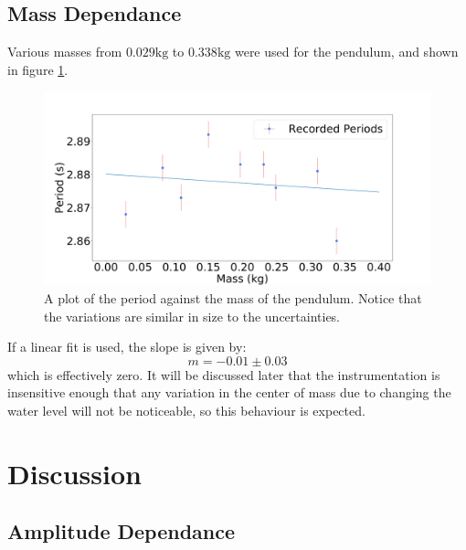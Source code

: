 \documentclass[%
 reprint,
 amsmath,amssymb
 aps,
]{revtex4-2}
\begin{document}
\subsection{Mass Dependance}
Various masses from $0.029\si{\kilogram}$ to $0.338\si{\kilogram}$ were used for the pendulum, and shown in figure \ref{fig:mass-simple}.
\begin{figure}[!h]
    \includegraphics[width=\linewidth]{Figures/mass_simple.png}

    \caption{A plot of the period against the mass of the pendulum. Notice that the variations are similar in size to the uncertainties.}
    \label{fig:mass-simple}
\end{figure}
If a linear fit is used, the slope is given by:
\begin{equation}
    m = -0.01 \pm 0.03
    \label{eq:}
\end{equation}
which is effectively zero. It will be discussed later that the instrumentation is insensitive enough that any variation in the center of mass due to changing the water level will not be noticeable, so this behaviour is expected.%
\section{Discussion}
\subsection{Amplitude Dependance}
\end{document}
